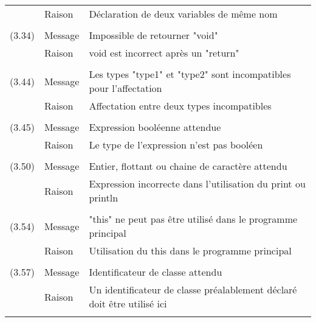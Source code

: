 \documentclass[11pt]{article}
\begin{document}
\begin{tabular}{lll}
      & Raison & Déclaration de deux variables de même nom\\
      \\      
      (3.34) & Message & Impossible de retourner "void"\\ 
      & Raison & void est incorrect après un "return"\\      
      \\
      (3.44) & Message & Les types "type1" et "type2" sont incompatibles pour l'affectation\\
      & Raison & Affectation entre deux types incompatibles\\
      \\
      (3.45) & Message & Expression booléenne attendue\\
      & Raison & Le type de l'expression n'est pas booléen\\
      \\
      (3.50) & Message & Entier, flottant ou chaine de caractère attendu\\
      & Raison & Expression incorrecte dans l'utilisation du print ou println\\
      \\
      (3.54) & Message & "this" ne peut pas être utilisé dans le programme principal\\
      & Raison & Utilisation du this dans le programme principal\\
      \\
      (3.57) & Message & Identificateur de classe attendu\\
      & Raison & Un identificateur de classe préalablement déclaré doit être utilisé ici\\           
      \\
      \end{tabular}
      
\end{document}
